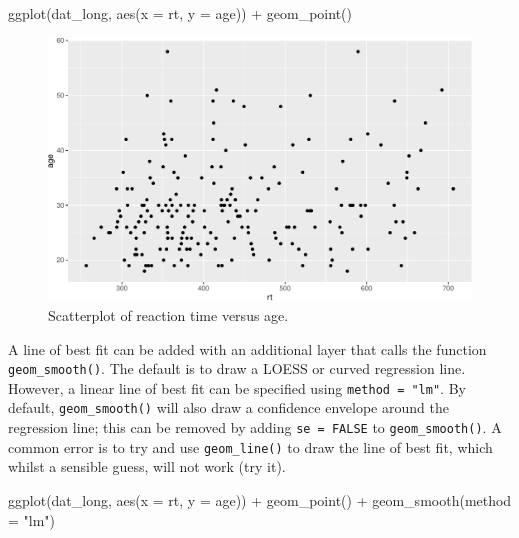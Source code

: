 \documentclass[
  english,
  doc,floatsintext]{apa6}
\newenvironment{Shaded}{\begin{snugshade}}{\end{snugshade}}
\newcommand{\AttributeTok}[1]{\textcolor[rgb]{0.77,0.63,0.00}{#1}}
\newcommand{\FunctionTok}[1]{\textcolor[rgb]{0.00,0.00,0.00}{#1}}
\newcommand{\NormalTok}[1]{#1}
\newcommand{\SpecialCharTok}[1]{\textcolor[rgb]{0.00,0.00,0.00}{#1}}
\newcommand{\StringTok}[1]{\textcolor[rgb]{0.31,0.60,0.02}{#1}}
\begin{document}
\begin{Shaded}
\begin{Highlighting}[]
\FunctionTok{ggplot}\NormalTok{(dat\_long, }\FunctionTok{aes}\NormalTok{(}\AttributeTok{x =}\NormalTok{ rt, }\AttributeTok{y =}\NormalTok{ age)) }\SpecialCharTok{+}
  \FunctionTok{geom\_point}\NormalTok{()}
\end{Highlighting}
\end{Shaded}

\begin{figure}

{\centering \includegraphics[width=1\linewidth]{images/point-plot-1} 

}

\caption{Scatterplot of reaction time versus age.}\label{fig:point-plot}
\end{figure}

A line of best fit can be added with an additional layer that calls the function \texttt{geom\_smooth()}. The default is to draw a LOESS or curved regression line. However, a linear line of best fit can be specified using \texttt{method\ =\ "lm"}. By default, \texttt{geom\_smooth()} will also draw a confidence envelope around the regression line; this can be removed by adding \texttt{se\ =\ FALSE} to \texttt{geom\_smooth()}. A common error is to try and use \texttt{geom\_line()} to draw the line of best fit, which whilst a sensible guess, will not work (try it).

\begin{Shaded}
\begin{Highlighting}[]
\FunctionTok{ggplot}\NormalTok{(dat\_long, }\FunctionTok{aes}\NormalTok{(}\AttributeTok{x =}\NormalTok{ rt, }\AttributeTok{y =}\NormalTok{ age)) }\SpecialCharTok{+}
  \FunctionTok{geom\_point}\NormalTok{() }\SpecialCharTok{+}
  \FunctionTok{geom\_smooth}\NormalTok{(}\AttributeTok{method =} \StringTok{"lm"}\NormalTok{)}
\end{Highlighting}
\end{Shaded}
\end{document}
